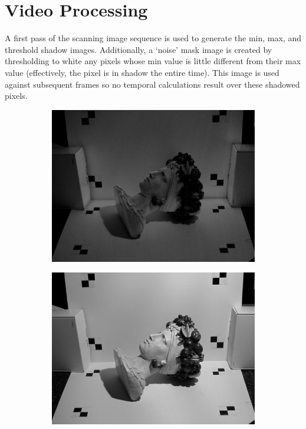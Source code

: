 \documentclass[10pt]{article}
\begin{document}
\section{Video Processing}
A first pass of the scanning image sequence is used to generate the min, max, and threshold shadow images. Additionally, a `noise' mask image is created by thresholding to white any pixels whose min value is little different from their max value (effectively, the pixel is in shadow the entire time). This image is used against subsequent frames so no temporal calculations result over these shadowed pixels.
\begin{figure}[h!]
  \centering

    \begin{subfigure}[b]{0.32\linewidth}
           \centering
            \includegraphics[width=\linewidth]{chiquita/minImg.jpg}           
    \end{subfigure}
    \begin{subfigure}[b]{0.32\linewidth}
           \centering
            \includegraphics[width=\linewidth]{chiquita/maxImg.jpg}           

\end{subfigure}
\end{figure}
\end{document}
